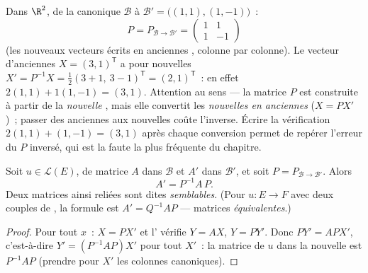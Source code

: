 \begin{example}
\label{ex:b1:matrices:changerun}
Dans $\R^2$, de la  canonique $\mathcal B$ à $\mathcal B' =
\bigl((1,1), (1,-1)\bigr)$~:
\[
P = P_{\mathcal B\to\mathcal B'} =
\begin{pmatrix} 1 & 1\\ 1 & -1 \end{pmatrix}
\]
(les nouveaux vecteurs écrits en anciennes , colonne par
colonne). Le vecteur d'anciennes  $X = (3, 1)^{\mathsf T}$ a
pour nouvelles  $X' = P^{-1}X = \frac12(3 + 1,\ 3 -
1)^{\mathsf T} = (2, 1)^{\mathsf T}$~: en effet $2(1,1) + 1(1,-1) =
(3,1)$. Attention au sens --- la matrice $P$ est construite à partir de
la \emph{nouvelle} , mais elle convertit les 
\emph{nouvelles en anciennes} ($X = PX'$)~; passer des anciennes aux
nouvelles coûte l'inverse. Écrire la vérification
$2(1,1) + (1,-1) = (3,1)$ après chaque conversion permet de repérer
l'erreur du $P$ inversé, qui est la faute la plus fréquente du
chapitre.
\end{example}

\begin{theorem}\label{thm:b1:matrices:conjugation}
Soit $u \in \mathcal{L}(E)$, de matrice $A$ dans $\mathcal{B}$ et $A'$
dans $\mathcal{B}'$, et soit $P = P_{\mathcal{B}\to\mathcal{B}'}$. Alors
\[
A' = P^{-1} A\, P .
\]
Deux matrices ainsi reliées sont dites \emph{semblables}. (Pour $u \colon E \to F$ avec deux couples de , la
formule est $A' = Q^{-1} A P$ --- matrices
\emph{équivalentes}.)
\end{theorem}

\begin{proof}
Pour tout $x$~: $X = PX'$ et l' vérifie $Y = AX$, $Y = PY'$.
Donc $PY' = APX'$, c'est-à-dire $Y' = (P^{-1}AP)X'$ pour tout $X'$~: la
matrice de $u$ dans la nouvelle  est $P^{-1}AP$ (prendre pour $X'$
les colonnes canoniques).
\end{proof}

